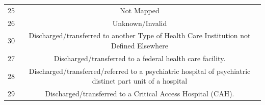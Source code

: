 \documentclass[]{article}
\begin{document}
\begin{itemize}
\begin{longtable}[c]{@{}cc@{}}
  \begin{minipage}[t]{0.35\columnwidth}\centering\strut
  25
  \strut\end{minipage} &
  \begin{minipage}[t]{0.41\columnwidth}\centering\strut
  Not Mapped
  \strut\end{minipage}\tabularnewline
  \begin{minipage}[t]{0.35\columnwidth}\centering\strut
  26
  \strut\end{minipage} &
  \begin{minipage}[t]{0.41\columnwidth}\centering\strut
  Unknown/Invalid
  \strut\end{minipage}\tabularnewline
  \begin{minipage}[t]{0.35\columnwidth}\centering\strut
  30
  \strut\end{minipage} &
  \begin{minipage}[t]{0.41\columnwidth}\centering\strut
  Discharged/transferred to another Type of Health Care Institution not
  Defined Elsewhere
  \strut\end{minipage}\tabularnewline
  \begin{minipage}[t]{0.35\columnwidth}\centering\strut
  27
  \strut\end{minipage} &
  \begin{minipage}[t]{0.41\columnwidth}\centering\strut
  Discharged/transferred to a federal health care facility.
  \strut\end{minipage}\tabularnewline
  \begin{minipage}[t]{0.35\columnwidth}\centering\strut
  28
  \strut\end{minipage} &
  \begin{minipage}[t]{0.41\columnwidth}\centering\strut
  Discharged/transferred/referred to a psychiatric hospital of
  psychiatric distinct part unit of a hospital
  \strut\end{minipage}\tabularnewline
  \begin{minipage}[t]{0.35\columnwidth}\centering\strut
  29
  \strut\end{minipage} &
  \begin{minipage}[t]{0.41\columnwidth}\centering\strut
  Discharged/transferred to a Critical Access Hospital (CAH).
  \strut\end{minipage}\tabularnewline
  \bottomrule
  \end{longtable}


\end{itemize}
\end{document}

